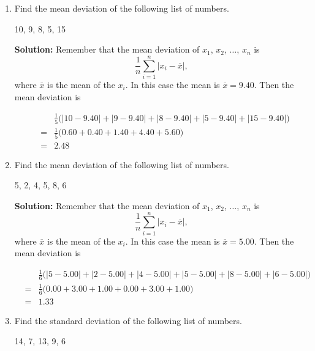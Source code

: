 \documentclass{article}
\begin{document}
\begin{enumerate}
  
\vspace{1cm}

\item Find the mean deviation of the following list of numbers.

\begin{center}
10, 9, 8, 5, 15
\end{center}

\textbf{Solution:} Remember that the mean deviation of $x_1$, $x_2$, $\ldots$, $x_n$ is \[ \frac{1}{n} \sum_{i=1}^n |x_i - \overline{x}|, \] where $\overline{x}$ is the mean of the $x_i$. In this case the mean is $\overline{x} = 9.40$. Then the mean deviation is

\begin{eqnarray*}
 & & \frac{1}{5} \big( |10 - 9.40| + |9 - 9.40| + |8 - 9.40| + |5 - 9.40| + |15 - 9.40| \big) \\
 & = & \frac{1}{5} \big( 0.60 + 0.40 + 1.40 + 4.40 + 5.60 \big) \\
 & = & 2.48
\end{eqnarray*}


  
\vspace{1cm}

\item Find the mean deviation of the following list of numbers.

\begin{center}
5, 2, 4, 5, 8, 6
\end{center}

\textbf{Solution:} Remember that the mean deviation of $x_1$, $x_2$, $\ldots$, $x_n$ is \[ \frac{1}{n} \sum_{i=1}^n |x_i - \overline{x}|, \] where $\overline{x}$ is the mean of the $x_i$. In this case the mean is $\overline{x} = 5.00$. Then the mean deviation is

\begin{eqnarray*}
 & & \frac{1}{6}\big( |5 - 5.00| + |2 - 5.00| + |4 - 5.00| + |5 - 5.00| + |8 - 5.00| + |6 - 5.00| \big) \\
 & = & \frac{1}{6}\big( 0.00 + 3.00 + 1.00 + 0.00 + 3.00 + 1.00 \big) \\
 & = & 1.33
\end{eqnarray*}


  
\vspace{1cm}

\item Find the standard deviation of the following list of numbers.

\begin{center}
14, 7, 13, 9, 6
\end{center}


\end{enumerate}
\end{document}
